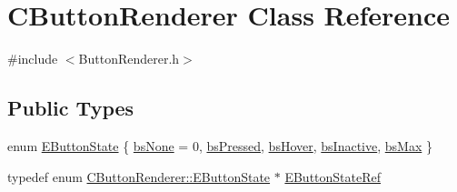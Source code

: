 \hypertarget{classCButtonRenderer}{}\section{C\+Button\+Renderer Class Reference}
\label{classCButtonRenderer}


{\ttfamily \#include $<$Button\+Renderer.\+h$>$}

\subsection*{Public Types}
\begin{DoxyCompactItemize}
\item 
enum \hyperlink{classCButtonRenderer_ae0eccda184600f6e14bfd59033e5e9a1}{E\+Button\+State} \{ \newline
\hyperlink{classCButtonRenderer_ae0eccda184600f6e14bfd59033e5e9a1aa0cd7277705307bef6c50f2250b5d62d}{bs\+None} = 0, 
\hyperlink{classCButtonRenderer_ae0eccda184600f6e14bfd59033e5e9a1a8fad69630f3700a97a0c51bcbb4441b5}{bs\+Pressed}, 
\hyperlink{classCButtonRenderer_ae0eccda184600f6e14bfd59033e5e9a1ad6758a415bde0eee152a0e2f7d07e3b6}{bs\+Hover}, 
\hyperlink{classCButtonRenderer_ae0eccda184600f6e14bfd59033e5e9a1a982d739b5c4b45ebf0b20a4c205a3531}{bs\+Inactive}, 
\newline
\hyperlink{classCButtonRenderer_ae0eccda184600f6e14bfd59033e5e9a1aa674e22146de8dfe27c5c1ad64f3e1bd}{bs\+Max}
 \}
\item 
typedef enum \hyperlink{classCButtonRenderer_ae0eccda184600f6e14bfd59033e5e9a1}{C\+Button\+Renderer\+::\+E\+Button\+State} $\ast$ \hyperlink{classCButtonRenderer_a402e6dc71de924ff3daf036e31048ce7}{E\+Button\+State\+Ref}
\end{DoxyCompactItemize}
